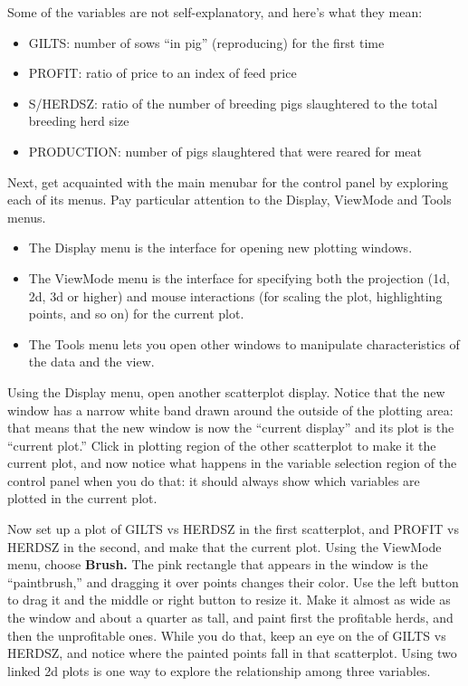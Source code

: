 \documentclass[11pt]{article}
\begin{document}
Some of the variables are not self-explanatory, and here's
what they mean:

\begin {itemize}
\item GILTS: number of sows ``in pig'' (reproducing) for the first time
\item PROFIT: ratio of price to an index of feed price
\item S/HERDSZ: ratio of the number of breeding pigs slaughtered to the total
      breeding herd size
\item PRODUCTION: number of pigs slaughtered that were reared for meat
\end {itemize}

Next, get acquainted with the main menubar for the control panel by
exploring each of its menus.  Pay particular attention to the
Display, ViewMode and Tools menus.

\begin {itemize}
\item The Display menu is the interface for opening new plotting
  windows.
\item The ViewMode menu is the interface for specifying both the
  projection (1d, 2d, 3d or higher) and mouse interactions (for scaling
  the plot, highlighting points, and so on) for the current plot.
\item The Tools menu lets you open other windows to manipulate
  characteristics of the data and the view.
\end {itemize}

Using the Display menu, open another scatterplot display. Notice that
the new window has a narrow white band drawn around the outside of
the plotting area:  that means that the new window is now the
``current display'' and its plot is the ``current plot.''  Click in
plotting region of the other scatterplot to make it the current plot,
and now notice what happens in the variable selection region of the
control panel when you do that:  it should always show which
variables are plotted in the current plot.

Now set up a plot of GILTS vs HERDSZ in the first scatterplot, and
PROFIT vs HERDSZ in the second, and make that the current plot.
Using the ViewMode menu, choose {\bf Brush.}   The pink rectangle
that appears in the window is the ``paintbrush,'' and dragging it
over points changes their color.  Use the left button to drag it and
the middle or right button to resize it.  Make it almost as wide as
the window and about a quarter as tall, and paint first the
profitable herds, and then the unprofitable ones.  While you do that,
keep an eye on the of GILTS vs HERDSZ, and notice where the painted
points fall in that scatterplot.  Using two linked 2d plots is one
way to explore the relationship among three variables.
\end{document}
